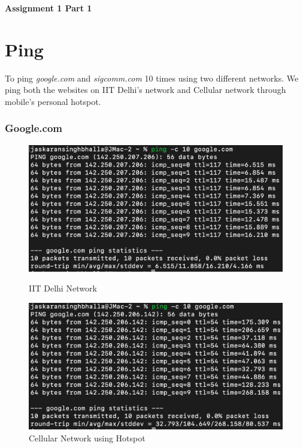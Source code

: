 \documentclass{article}
\begin{document}
\begin{center}
 \LARGE\bfseries Assignment 1 Part 1
\end{center}

\section{Ping}


\normalsize
To ping \textit{google.com} and \textit{sigcomm.com} 10 times using two different networks.
We ping both the websites on IIT Delhi's network and Cellular network through mobile's personal hotspot.

\subsubsection*{Google.com}

\begin{figure}[H]
    \centering
    \begin{minipage}{0.5\textwidth}
        \centering
        \includegraphics[width=\linewidth]{part-1/ping-google-iitd.png}
        \caption{IIT Delhi Network}
    \end{minipage}
    \hfill
    \begin{minipage}{0.45\textwidth}
        \centering
        \includegraphics[width=\linewidth]{part-1/ping-google-hotspot.png}
        \caption{Cellular Network using Hotspot}
    \end{minipage}
\end{figure}
\end{document}
